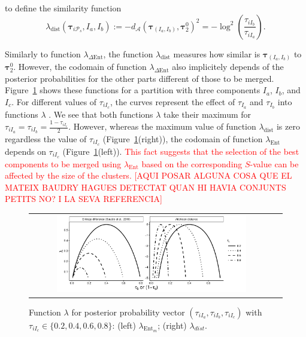 \documentclass[submit]{smj}
\theoremstyle{definition}
\newcommand{\m}[1]{\boldsymbol{#1}}
\begin{document}
 to define the similarity function
\[
\lambda_{\text{dist}}(\m\tau_{i \mathcal{P}_s},  I_a,  I_b) := -d_\mathcal{A}\left(\m\tau_{\left(I_a, I_b\right)}, \m\tau_2^0 \right)^2 = -\log^2 \left(\frac{ \tau_{iI_b} }{ \tau_{iI_a} }\right).
\]



Similarly to function $\lambda_{\Delta\text{Ent}}$, the function $\lambda_{\text{dist}}$  measures how similar is $\m\tau_{\left(I_a, I_b\right)}$ to $\m\tau_2^0$. However, the codomain of function $\lambda_{\Delta\text{Ent}}$ also implicitely depends of the posterior probabilities for the other parts different of those to be merged. Figure~\ref{symetric} shows these functions for a partition with three components $I_a$, $I_b$, and $I_c$. For different values of $\tau_{iI_c}$, the curves represent the effect of $\tau_{I_a}$ and $\tau_{I_b}$ into functions $\lambda$ . We see that both functions $\lambda$ take their maximum for $\tau_{iI_a}=\tau_{iI_b}=\frac{1-\tau_{i I_c}}{2}$. However, whereas the maximum value of function $\lambda_{\text{dist}}$ is zero regardless the value of $\tau_{iI_c}$ (Figure~\ref{symetric}(right)), the codomain of function $\lambda_{\text{Ent}}$ depends on $\tau_{iI_c}$ (Figure~\ref{symetric}(left)). \textcolor{red}{This fact suggests that the selection of the best components to be merged using $\lambda_{\text{Ent}}$ based on the corresponding $S$-value can be affected by the size of the clusters. [AQUI POSAR ALGUNA COSA QUE EL MATEIX BAUDRY HAGUES DETECTAT QUAN HI HAVIA CONJUNTS PETITS NO? I LA SEVA REFERENCIA]}

\begin{figure}[htpb]
\begin{center}
\begin{tabular}{cc}
  \includegraphics[width=0.8\textwidth]{figures/entr_dist.pdf} \\
 \end{tabular}
 \caption{Function $\lambda$ for posterior probability 
vector $\left(\tau_{iI_a}, \tau_{iI_b}, \tau_{iI_c} \right)$ with $\tau_{iI_c} \in \{0.2, 0.4, 0.6, 0.8\}$: (left) $\lambda_{\text{Ent}_m}$; (right) $\lambda_{dist}$.} 
\label{symetric}
\end{center}
\end{figure}
\end{document}
